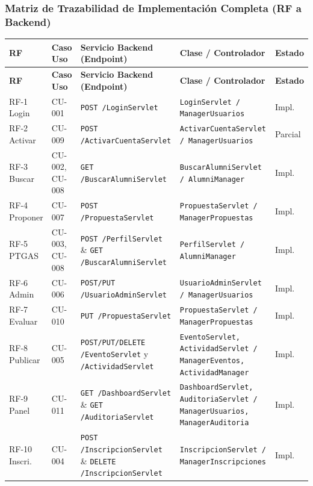 \documentclass{report}
\begin{document}
\subsubsection*{Matriz de Trazabilidad de Implementación Completa (RF a Backend)}
\begin{center}
\begin{longtable}{|p{}|p{}|p{}|p{}|p{}|}
\hline
\textbf{RF} & \textbf{Caso Uso} & \textbf{Servicio Backend (Endpoint)} & \textbf{Clase / Controlador} & \textbf{Estado} \\ \hline
\endfirsthead
\hline
\textbf{RF} & \textbf{Caso Uso} & \textbf{Servicio Backend (Endpoint)} & \textbf{Clase / Controlador} & \textbf{Estado} \\ \hline
\endhead
RF-1 Login & CU-001 & \texttt{POST /LoginServlet} & \texttt{LoginServlet / ManagerUsuarios} & Impl. \\ \hline
RF-2 Activar & CU-009 & \texttt{POST /ActivarCuentaServlet} & \texttt{ActivarCuentaServlet / ManagerUsuarios} & Parcial \\ \hline
RF-3 Buscar & CU-002, CU-008 & \texttt{GET /BuscarAlumniServlet} & \texttt{BuscarAlumniServlet / AlumniManager} & Impl. \\ \hline
RF-4 Proponer & CU-007 & \texttt{POST /PropuestaServlet} & \texttt{PropuestaServlet / ManagerPropuestas} & Impl. \\ \hline
RF-5 PTGAS & CU-003, CU-008 & \texttt{POST /PerfilServlet} \& \texttt{GET /BuscarAlumniServlet} & \texttt{PerfilServlet / AlumniManager} & Impl. \\ \hline
RF-6 Admin & CU-006 & \texttt{POST/PUT /UsuarioAdminServlet} & \texttt{UsuarioAdminServlet / ManagerUsuarios} & Impl. \\ \hline
RF-7 Evaluar & CU-010 & \texttt{PUT /PropuestaServlet} & \texttt{PropuestaServlet / ManagerPropuestas} & Impl. \\ \hline
RF-8 Publicar & CU-005 & \texttt{POST/PUT/DELETE /EventoServlet} y \texttt{/ActividadServlet} & \texttt{EventoServlet, ActividadServlet / ManagerEventos, ActividadManager} & Impl. \\ \hline
RF-9 Panel & CU-011 & \texttt{GET /DashboardServlet} \& \texttt{GET /AuditoriaServlet} & \texttt{DashboardServlet, AuditoriaServlet / ManagerUsuarios, ManagerAuditoria} & Impl. \\ \hline
RF-10 Inscri. & CU-004 & \texttt{POST /InscripcionServlet} \& \texttt{DELETE /InscripcionServlet} & \texttt{InscripcionServlet / ManagerInscripciones} & Impl. \\ \hline

\end{longtable}
\end{center}
\end{document}
